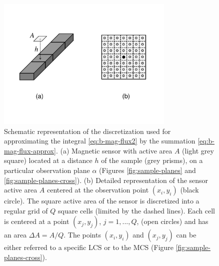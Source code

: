 \documentclass[draft,gc]{agutex}
\begin{document}
 \begin{figure}
 \noindent \includegraphics[width=20pc]{Figs/Fig4b_HQ.pdf}
 \caption{Schematic representation of the discretization
 used for approximating the integral \ref{eq:b-mag-flux2} by 
 the summation \ref{eq:b-mag-flux-approx}.
 (a) Magnetic sensor with active area $A$ (light grey square) located at
 a distance $h$ of the sample (grey prisms), on a particular observation
 plane $\alpha$ (Figures \ref{fig:sample-planes} and 
 \ref{fig:sample-planes-cross}). (b) Detailed representation
 of the sensor active area $A$ centered at the observation point
 $(x_{i}, y_{i})$ (black circle). 
 The square active area 
 of the sensor is discretized into a regular grid of $Q$ square cells 
 (limited by the dashed lines). Each cell is centered at a point 
 $(x_{j}, y_{j})$, $j = 1, ..., Q$, (open circles) and 
 has an area $\Delta A = A/Q$. The points $(x_{i}, y_{i})$
 and $(x_{j}, y_{j})$ can be either referred to a specific LCS or
 to the MCS (Figure \ref{fig:sample-planes-cross}).}
 \label{fig:b-mag-flux-approx}
 \end{figure} 
 
\end{document}
